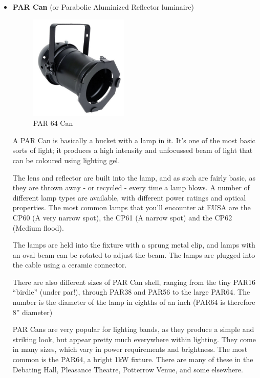 \documentclass[14pt]{article} %
\begin{document}
\begin{itemize}
\item \textbf{PAR Can} (or Parabolic Aluminized Reflector luminaire) 

\begin{figure}[h]
\begin{center}

\includegraphics[height=5cm]{PAR64.jpg}
\caption{PAR 64 Can}
\label{fig:par64}

\end{center}
\end{figure}

A PAR Can is basically a bucket with a lamp in it. 
It’s one of the most basic sorts of light; it produces a high intensity and unfocussed beam of light that can be coloured using lighting gel. 

The lens and reflector are built into the lamp, and as such are fairly basic, as they are thrown away - or recycled - every time a lamp blows.
A number of different lamp types are available, with different power ratings and optical properties. The most common lamps that you’ll encounter at EUSA are the CP60 (A very narrow spot), the CP61 (A narrow spot) and the CP62 (Medium flood).

The lamps are held into the fixture with a sprung metal clip, and lamps with an oval beam can be rotated to adjust the beam. The lamps are plugged into the cable using a ceramic connector.

There are also different sizes of PAR Can shell, ranging from the tiny PAR16 “birdie” (under par!), through PAR38 and PAR56 to the large PAR64. The number is the diameter of the lamp in eighths of an inch (PAR64 is therefore 8” diameter)

PAR Cans are very popular for lighting bands, as they produce a simple and striking look, but appear pretty much everywhere within lighting. They come in many sizes, which vary in power requirements and brightness. The most common is the PAR64, a bright 1kW fixture. There are many of these in the Debating Hall, Pleasance Theatre, Potterrow Venue, and some elsewhere.


\end{itemize}
\end{document}
